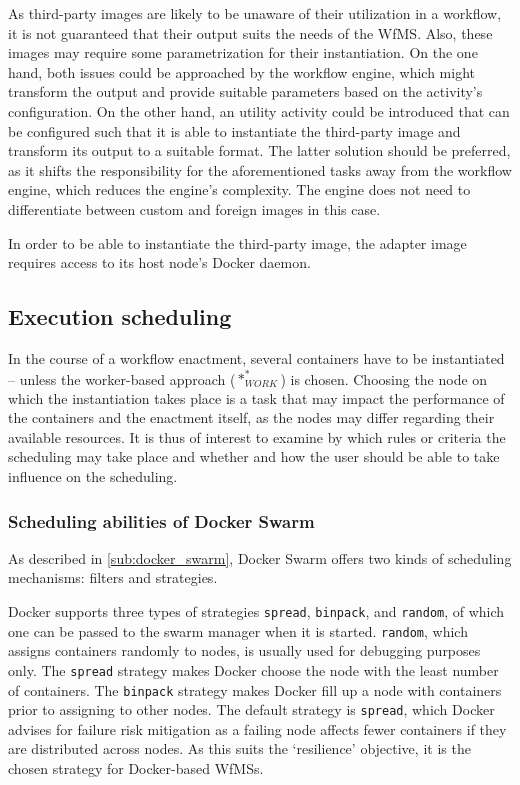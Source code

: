   As third-party images are likely to be unaware of their utilization in a workflow, it is not guaranteed that their output suits the needs of the \ac{WfMS}. Also, these images may require some parametrization for their instantiation. On the one hand, both issues could be approached by the workflow engine, which might transform the output and provide suitable parameters based on the activity's configuration. On the other hand, an utility activity could be introduced that can be configured such that it is able to instantiate the third-party image and transform its output to a suitable format.
  The latter solution should be preferred, as it shifts the responsibility for the aforementioned tasks away from the workflow engine, which reduces the engine's complexity. The engine does not need to differentiate between custom and foreign images in this case.

  In order to be able to instantiate the third-party image, the adapter image requires access to its host node's Docker daemon.


\subsection{Execution scheduling} %
\label{sub:execution_scheduling}
  In the course of a workflow enactment, several containers have to be instantiated -- unless the worker-based approach ($*_{WORK}^{*}$) is chosen. Choosing the node on which the instantiation takes place is a task that may impact the performance of the containers and the enactment itself, as the nodes may differ regarding their available resources. It is thus of interest to examine by which rules or criteria the scheduling may take place and whether and how the user should be able to take influence on the scheduling.

  \subsubsection{Scheduling abilities of Docker Swarm} %
    \label{ssub:abilities_of_docker_swarm}
    As described in \ref{sub:docker_swarm}, Docker Swarm offers two kinds of scheduling mechanisms: filters and strategies.

    Docker supports three types of strategies \texttt{spread}, \texttt{binpack}, and \texttt{random}, of which one can be passed to the swarm manager when it is started. \texttt{random}, which assigns containers randomly to nodes, is usually used for debugging purposes only. The \texttt{spread} strategy makes Docker choose the node with the least number of containers. The \texttt{binpack} strategy makes Docker fill up a node with containers prior to assigning to other nodes. The default strategy is \texttt{spread}, which Docker advises for failure risk mitigation as a failing node affects fewer containers if they are distributed across nodes. As this suits the `resilience' objective, it is the chosen strategy for Docker-based \acp{WfMS}.

